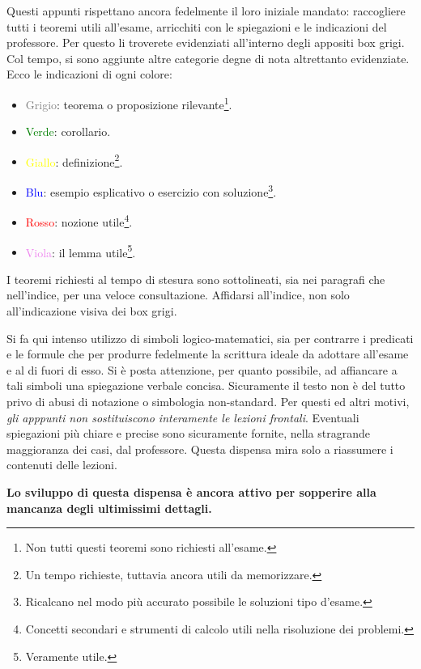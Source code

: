 \documentclass[oneside]{book}
\theoremstyle{remark}
\begin{document}
Questi appunti rispettano ancora fedelmente il loro iniziale mandato:
raccogliere tutti i teoremi utili all'esame, arricchiti con le spiegazioni
e le indicazioni del professore. Per questo li troverete evidenziati
all'interno degli appositi box grigi. Col tempo, si sono aggiunte altre
categorie degne di nota altrettanto evidenziate. Ecco le indicazioni di ogni
colore:
\begin{itemize}
\item \textcolor{gray}{Grigio}: teorema o proposizione rilevante\footnote{Non tutti questi teoremi sono richiesti all'esame.}.
\item \textcolor{green}{Verde}: corollario.
\item \textcolor{yellow}{Giallo}: definizione\footnote{Un tempo richieste, tuttavia ancora utili da memorizzare.}.
\item \textcolor{blue}{Blu}: esempio esplicativo o esercizio con soluzione\footnote{Ricalcano nel modo più accurato possibile le soluzioni tipo d'esame.}.
\item \textcolor{red}{Rosso}: nozione utile\footnote{Concetti secondari e strumenti di calcolo utili nella risoluzione dei problemi.}.
\item \textcolor{violet}{Viola}: il lemma utile\footnote{Veramente utile.}.
\end{itemize}
I teoremi richiesti al tempo di stesura sono sottolineati, sia
nei paragrafi che nell'indice, per una veloce consultazione.
Affidarsi all'indice, non solo all'indicazione visiva dei box
grigi.

Si fa qui intenso utilizzo di simboli logico-matematici, sia per
contrarre i predicati e le formule che per produrre fedelmente la
scrittura ideale da adottare all'esame e al di fuori di esso. Si
è posta attenzione, per quanto possibile, ad affiancare a tali
simboli una spiegazione verbale concisa. Sicuramente il testo non
è del tutto privo di abusi di notazione o simbologia non-standard.
Per questi ed altri motivi, \textit{gli apppunti non sostituiscono
interamente le lezioni frontali}. Eventuali spiegazioni più chiare
e precise sono sicuramente fornite, nella stragrande maggioranza dei
casi, dal professore. Questa dispensa mira solo a riassumere i contenuti
delle lezioni.

\begin{center}
\small
\textbf{Lo sviluppo di questa dispensa è ancora attivo per sopperire alla
mancanza degli ultimissimi dettagli.}
\end{center}
\end{document}
